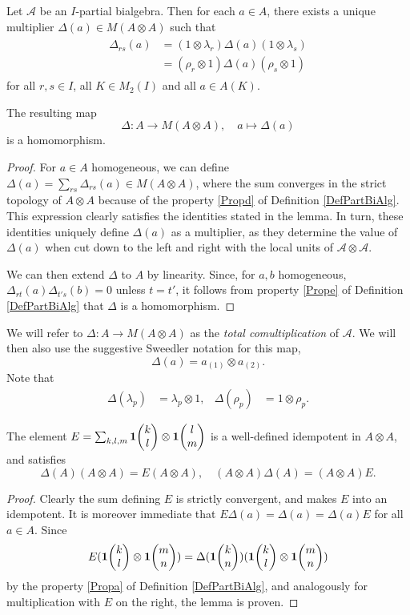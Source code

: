 \begin{Lem} Let $\mathscr{A}$ be an $I$-partial bialgebra. Then for each $a\in A$, there exists a unique multiplier $\Delta(a) \in M(A\otimes A)$ such that \begin{align}\label{EqDel}
    \begin{aligned}
      \Delta_{rs}(a) &= (1\otimes \lambda_r)\Delta(a)(1\otimes
      \lambda_s) \\ &= (\rho_r\otimes 1)\Delta(a)(\rho_s\otimes 1)
    \end{aligned}
\end{align}  for all $r,s\in I$, all $K\in M_2(I)$ and all $a\in A(K)$. 

The resulting map \[\Delta:A\rightarrow M(A\otimes A),\quad a\mapsto \Delta(a)\] is a homomorphism.
\end{Lem}
\begin{proof} For $a\in A$ homogeneous, we can define $\Delta(a) = \sum_{rs} \Delta_{rs}(a) \in M(A\otimes A)$, where the sum converges in the strict topology of $A\otimes A$ because of the property \ref{Propd} of Definition \ref{DefPartBiAlg}. This expression clearly satisfies the identities stated in the lemma. In turn, these identities uniquely define $\Delta(a)$ as a multiplier, as they determine the value of $\Delta(a)$ when cut down to the left and right with the local units of $\mathscr{A}\otimes \mathscr{A}$.

We can then extend $\Delta$ to $A$ by linearity. Since, for $a,b$ homogeneous, $\Delta_{rt}(a)\Delta_{t's}(b)=0$ unless $t=t'$, it follows from property \ref{Prope} of Definition \ref{DefPartBiAlg} that $\Delta$ is a homomorphism. 
\end{proof}

We will refer to $\Delta: A\rightarrow M(A\otimes A)$ as the \emph{total comultiplication} of $\mathscr{A}$. We will then also use the suggestive Sweedler notation for this map, \[\Delta(a) = a_{(1)}\otimes a_{(2)}.\]
Note that
\begin{align} \label{eq:delta-lambda-rho} \Delta(\lambda_{p}) &=
  \lambda_{p} \otimes 1, & \Delta(\rho_{p}) &= 1 \otimes \rho_{p}.
\end{align}
\begin{Lem} The element $E = \sum_{k,l,m} \mathbf{1}\!\begin{pmatrix} k \\ l\end{pmatrix}\otimes \mathbf{1}\!\begin{pmatrix} l \\ m\end{pmatrix}$ is a well-defined idempotent in $A\otimes A$, and satisfies \[\Delta(A)(A\otimes A)=E(A\otimes A),\quad (A\otimes A)\Delta(A)= (A\otimes A)E.\]
\end{Lem} 
\begin{proof} Clearly the sum defining $E$ is strictly convergent, and makes $E$ into an idempotent. It is moreover immediate that $E\Delta(a)=\Delta(a) = \Delta(a)E$ for all $a\in A$. Since \[E(\mathbf{1}\!\begin{pmatrix} k \\ l\end{pmatrix}\otimes \mathbf{1}\!\begin{pmatrix} m \\ n\end{pmatrix}) = \Delta(\mathbf{1}\!\begin{pmatrix} k \\ n\end{pmatrix})(\mathbf{1}\!\begin{pmatrix} k \\ l\end{pmatrix}\otimes \mathbf{1}\!\begin{pmatrix} m \\ n\end{pmatrix}) \] by the property \ref{Propa} of Definition \ref{DefPartBiAlg}, and analogously for multiplication with $E$ on the right, the lemma is proven. 
\end{proof} 

